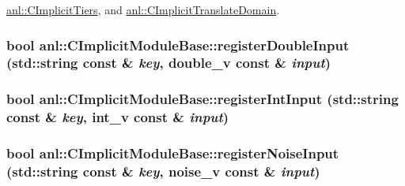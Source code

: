 \hyperlink{classanl_1_1CImplicitTiers_a497494a60352ce9490ddd28125beb01a}{anl::CImplicitTiers}, and \hyperlink{classanl_1_1CImplicitTranslateDomain_a8f0d141a02e5e67245d07ee30324d13d}{anl::CImplicitTranslateDomain}.\hypertarget{classanl_1_1CImplicitModuleBase_ab86eb749d539e8282219e0f05de9c96c}{
\subsubsection[{registerDoubleInput}]{\setlength{\rightskip}{0pt plus 5cm}bool anl::CImplicitModuleBase::registerDoubleInput (std::string const \& {\em key}, \/  {\bf double\_\-v} const \& {\em input})}}
\label{classanl_1_1CImplicitModuleBase_ab86eb749d539e8282219e0f05de9c96c}
\hypertarget{classanl_1_1CImplicitModuleBase_ac4143972345effb4c616e04b885d1076}{
\subsubsection[{registerIntInput}]{\setlength{\rightskip}{0pt plus 5cm}bool anl::CImplicitModuleBase::registerIntInput (std::string const \& {\em key}, \/  {\bf int\_\-v} const \& {\em input})}}
\label{classanl_1_1CImplicitModuleBase_ac4143972345effb4c616e04b885d1076}
\hypertarget{classanl_1_1CImplicitModuleBase_a830c5360e7cac6e4bd2c804105776dad}{
\subsubsection[{registerNoiseInput}]{\setlength{\rightskip}{0pt plus 5cm}bool anl::CImplicitModuleBase::registerNoiseInput (std::string const \& {\em key}, \/  {\bf noise\_\-v} const \& {\em input})}}
\label{classanl_1_1CImplicitModuleBase_a830c5360e7cac6e4bd2c804105776dad}
